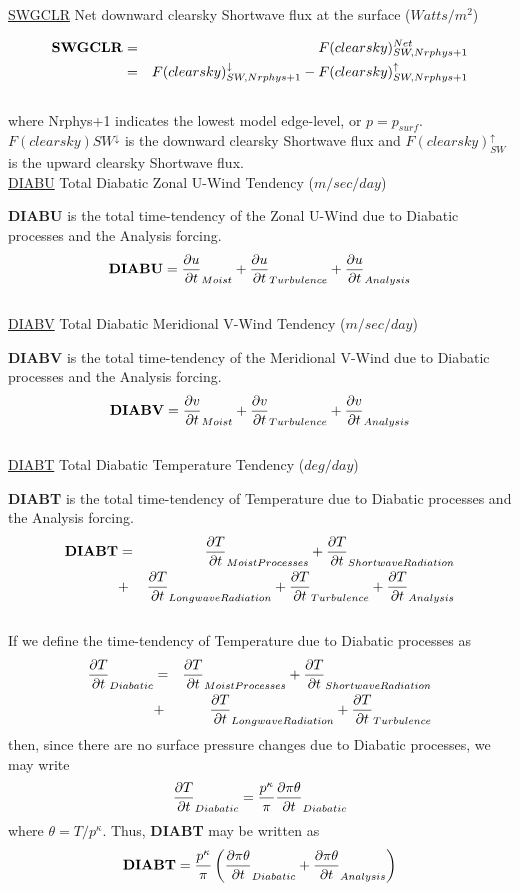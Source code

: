 \noindent
{ \underline {SWGCLR} Net downward clearsky Shortwave flux at the surface ($Watts/m^2$) }

\noindent
\begin{eqnarray*}
{\bf SWGCLR} & =  & F(clearsky)_{SW,Nrphys+1}^{Net} \\
             & =  & F(clearsky)_{SW,Nrphys+1}^\downarrow - F(clearsky)_{SW,Nrphys+1}^\uparrow
\end{eqnarray*}
\noindent
\\
where Nrphys+1 indicates the lowest model edge-level, or $p = p_{surf}$.
$F(clearsky){SW}^\downarrow$ is
the downward clearsky Shortwave flux and $F(clearsky)_{SW}^\uparrow$ is 
the upward clearsky Shortwave flux.
\\

\noindent
{ \underline {DIABU} Total Diabatic Zonal U-Wind Tendency  ($m/sec/day$) }

\noindent
{\bf DIABU} is the total time-tendency of the Zonal U-Wind due to Diabatic processes
and the Analysis forcing.
\[
{\bf DIABU} = \frac{\partial u}{\partial t}_{Moist} + \frac{\partial u}{\partial t}_{Turbulence} + \frac{\partial u}{\partial t}_{Analysis} 
\]
\\

\noindent
{ \underline {DIABV} Total Diabatic Meridional V-Wind Tendency  ($m/sec/day$) }

\noindent
{\bf DIABV} is the total time-tendency of the Meridional V-Wind due to Diabatic processes
and the Analysis forcing.
\[
{\bf DIABV} = \frac{\partial v}{\partial t}_{Moist} + \frac{\partial v}{\partial t}_{Turbulence} + \frac{\partial v}{\partial t}_{Analysis} 
\]
\\

\noindent
{ \underline {DIABT} Total Diabatic Temperature Tendency  ($deg/day$) }

\noindent
{\bf DIABT} is the total time-tendency of Temperature due to Diabatic processes
and the Analysis forcing.
\begin{eqnarray*}
{\bf DIABT} & = & \pp{T}{t}_{Moist Processes} + \pp{T}{t}_{Shortwave Radiation} \\
           & + & \pp{T}{t}_{Longwave Radiation} + \pp{T}{t}_{Turbulence} + \pp{T}{t}_{Analysis} 
\end{eqnarray*}
\\
If we define the time-tendency of Temperature due to Diabatic processes as
\begin{eqnarray*}
\pp{T}{t}_{Diabatic} & = & \pp{T}{t}_{Moist Processes} + \pp{T}{t}_{Shortwave Radiation} \\
                     & + & \pp{T}{t}_{Longwave Radiation} + \pp{T}{t}_{Turbulence}
\end{eqnarray*}
then, since there are no surface pressure changes due to Diabatic processes, we may write
\[
\frac{\partial T}{\partial t}_{Diabatic} = \frac{p^\kappa}{\pi}\frac{\partial \pi \theta}{\partial t}_{Diabatic}
\]
where $\theta = T/p^\kappa$.  Thus, {\bf DIABT} may be written as
\[
{\bf DIABT} = \frac{p^\kappa}{\pi} \left( \frac{\partial \pi \theta}{\partial t}_{Diabatic} + \frac{\partial \pi \theta}{\partial t}_{Analysis} \right)
\]
\\

